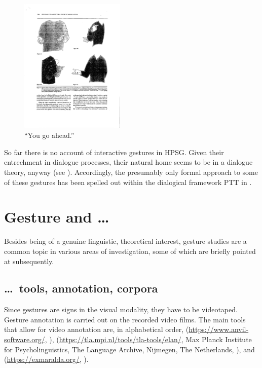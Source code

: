 \documentclass[output=paper]{langsci/langscibook}
\begin{document}
\begin{figure}
  \centering
  \includegraphics[trim={11cm 4cm 13cm 10.5cm}, clip, angle=90, width=5cm]{figures/InteractiveGestures}
\caption{\enquote{You go ahead.}}
\label{fig:yourturn}
\end{figure}

So far there is no account of interactive gestures in HPSG. 
%
Given their entrechment in dialogue processes, their natural home seems to be in a dialogue theory, anyway (see ).
%
Accordingly, the presumably only formal approach to some of these gestures has been spelled out within the dialogical framework PTT in \citet{Rieser:Poesio:2009}.




\section{Gesture and \ldots}
\label{sec:gesture-and}

Besides being of a genuine linguistic, theoretical interest, gesture studies are a common topic in various areas of investigation, some of which are briefly pointed at subsequently. 


\subsection{\ldots\ tools, annotation, corpora}
\label{sec:tools-annotation-corpora}

Since gestures are signs in the visual modality, they have to be videotaped.
%
Gesture annotation is carried out on the recorded video films.
%
The main tools that allow for video annotation are, in alphabetical order,  (\url{https://www.anvil-software.org/}, \citealp{Kipp:2014}),  (\url{https://tla.mpi.nl/tools/tla-tools/elan/}, Max Planck Institute for Psycholinguistics, The Language Archive, Nijmegen, The Netherlands, \citealp{Sloetjes:Wittenburg:2008}), and  (\url{https://exmaralda.org/}, \citealp{Schmidt:2012}).
\end{document}
